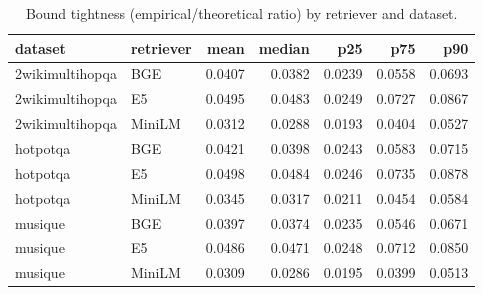 \begin{table}
\caption{Bound tightness (empirical/theoretical ratio) by retriever and dataset.}
\label{tab:table4_bound_tightness}
\begin{tabular}{llrrrrr}
\toprule
dataset & retriever & mean & median & p25 & p75 & p90 \\
\midrule
2wikimultihopqa & BGE & 0.0407 & 0.0382 & 0.0239 & 0.0558 & 0.0693 \\
2wikimultihopqa & E5 & 0.0495 & 0.0483 & 0.0249 & 0.0727 & 0.0867 \\
2wikimultihopqa & MiniLM & 0.0312 & 0.0288 & 0.0193 & 0.0404 & 0.0527 \\
hotpotqa & BGE & 0.0421 & 0.0398 & 0.0243 & 0.0583 & 0.0715 \\
hotpotqa & E5 & 0.0498 & 0.0484 & 0.0246 & 0.0735 & 0.0878 \\
hotpotqa & MiniLM & 0.0345 & 0.0317 & 0.0211 & 0.0454 & 0.0584 \\
musique & BGE & 0.0397 & 0.0374 & 0.0235 & 0.0546 & 0.0671 \\
musique & E5 & 0.0486 & 0.0471 & 0.0248 & 0.0712 & 0.0850 \\
musique & MiniLM & 0.0309 & 0.0286 & 0.0195 & 0.0399 & 0.0513 \\
\bottomrule
\end{tabular}
\end{table}

